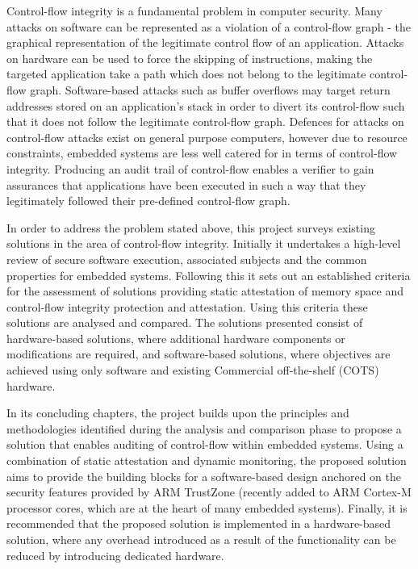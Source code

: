 Control-flow integrity is a fundamental problem in computer security. Many attacks on software can be represented as a violation of a control-flow graph - the graphical representation of the legitimate control flow of an application. Attacks on hardware can be used to force the skipping of instructions, making the targeted application take a path which does not belong to the legitimate control-flow graph. Software-based attacks such as buffer overflows may target return addresses stored on an application's stack in order to divert its control-flow such that it does not follow the legitimate control-flow graph. Defences for attacks on control-flow attacks exist on general purpose computers, however due to resource constraints, embedded systems are less well catered for in terms of control-flow integrity. Producing an audit trail of control-flow enables a verifier to gain assurances that applications have been executed in such a way that they legitimately followed their pre-defined control-flow graph.

In order to address the problem stated above, this project surveys existing solutions in the area of control-flow integrity. Initially it undertakes a high-level review of secure software execution, associated subjects and the common properties for embedded systems. Following this it sets out an established criteria for the assessment of solutions providing static attestation of memory space and control-flow integrity protection and attestation. Using this criteria these solutions are analysed and compared. The solutions presented consist of hardware-based solutions, where additional hardware components or modifications are required, and software-based solutions, where objectives are achieved using only software and existing Commercial off-the-shelf (COTS) hardware.

In its concluding chapters, the project builds upon the principles and methodologies identified during the analysis and comparison phase to propose a solution that enables auditing of control-flow within embedded systems. Using a combination of static attestation and dynamic monitoring, the proposed solution aims to provide the building blocks for a software-based design anchored on the security features provided by ARM TrustZone (recently added to ARM Cortex-M processor cores, which are at the heart of many embedded systems). Finally, it is recommended that the proposed solution is implemented in a hardware-based solution, where any overhead introduced as a result of the functionality can be reduced by introducing dedicated hardware.
